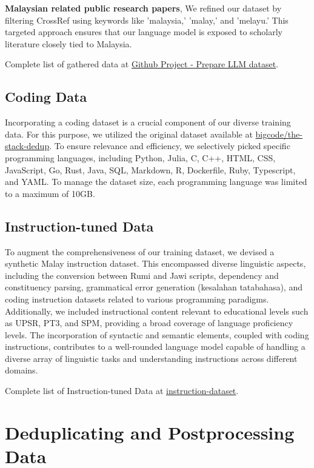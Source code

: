 \documentclass[preprint]{article}
\begin{document}
\textbf{Malaysian related public research papers}, We refined our dataset by filtering CrossRef using keywords like 'malaysia,' 'malay,' and 'melayu.' This targeted approach ensures that our language model is exposed to scholarly literature closely tied to Malaysia.

Complete list of gathered data at \href{https://github.com/users/huseinzol05/projects/1}{Github Project - Prepare LLM dataset}.

\subsection{Coding Data}

Incorporating a coding dataset is a crucial component of our diverse training data. For this purpose, we utilized the original dataset available at \href{https://huggingface.co/datasets/bigcode/the-stack-dedup}{bigcode/the-stack-dedup}. To ensure relevance and efficiency, we selectively picked specific programming languages, including Python, Julia, C, C++, HTML, CSS, JavaScript, Go, Rust, Java, SQL, Markdown, R, Dockerfile, Ruby, Typescript, and YAML. To manage the dataset size, each programming language was limited to a maximum of 10GB.

\subsection{Instruction-tuned Data}

To augment the comprehensiveness of our training dataset, we devised a synthetic Malay instruction dataset. This encompassed diverse linguistic aspects, including the conversion between Rumi and Jawi scripts, dependency and constituency parsing, grammatical error generation (kesalahan tatabahasa), and coding instruction datasets related to various programming paradigms. Additionally, we included instructional content relevant to educational levels such as UPSR, PT3, and SPM, providing a broad coverage of language proficiency levels. The incorporation of syntactic and semantic elements, coupled with coding instructions, contributes to a well-rounded language model capable of handling a diverse array of linguistic tasks and understanding instructions across different domains.

Complete list of Instruction-tuned Data at \href{https://github.com/mesolitica/malaya/wiki/MaLLaM-%F0%9F%8C%99-Malaysia-Large-Language-Model#instruction-dataset}{instruction-dataset}.

\section{Deduplicating and Postprocessing Data}
\end{document}
